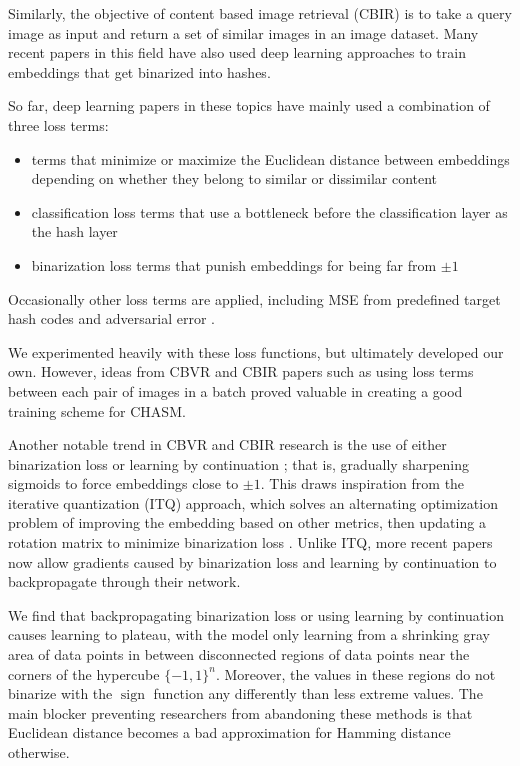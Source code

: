 \documentclass{article}
\DeclareMathOperator{\sign}{sign}
\begin{document}
\begin{multicols}{2}
Similarly, the objective of content based image retrieval (CBIR) is to take a query image as input and return a set of similar images in an image dataset.
Many recent papers in this field have also used deep learning approaches to train embeddings that get binarized into hashes.

So far, deep learning papers in these topics have mainly used a combination of three loss terms:
\begin{itemize}
\item terms that minimize or maximize the Euclidean distance between embeddings depending on whether they belong to similar or dissimilar content \cite{cnnh14, compact15, supervised16, efficient16, feature16, hashnet17, video_deep17, video_mask17, adversarial17}
\item classification loss terms that use a bottleneck before the classification layer as the hash layer \cite{fast15, semantic17, video_deep17, video_mask17}
\item binarization loss terms that punish embeddings for being far from $\pm1$ \cite{compact15, supervised16, efficient16, feature16, adversarial17}
\end{itemize}

Occasionally other loss terms are applied, including MSE from predefined target hash codes \cite{representation17} and adversarial error \cite{adversarial17}. 

We experimented heavily with these loss functions, but ultimately developed our own.
However, ideas from CBVR and CBIR papers such as using loss terms between each pair of images in a batch \cite{compact15} proved valuable in creating a good training scheme for CHASM.

Another notable trend in CBVR and CBIR research is the use of either binarization loss or learning by continuation \cite{hashnet17}; that is, gradually sharpening sigmoids to force embeddings close to $\pm1$.
This draws inspiration from the iterative quantization (ITQ) approach, which solves an alternating optimization problem of improving the embedding based on other metrics, then updating a rotation matrix to minimize binarization loss \cite{itq13}.
Unlike ITQ, more recent papers now allow gradients caused by binarization loss and learning by continuation to backpropagate through their network.

We find that backpropagating binarization loss or using learning by continuation causes learning to plateau, with the model only learning from a shrinking gray area of data points in between disconnected regions of data points near the corners of the hypercube $\{-1, 1\}^n$.
Moreover, the values in these regions do not binarize with the $\sign$ function any differently than less extreme values.
The main blocker preventing researchers from abandoning these methods is that Euclidean distance becomes a bad approximation for Hamming distance otherwise.



\end{multicols}
\end{document}
